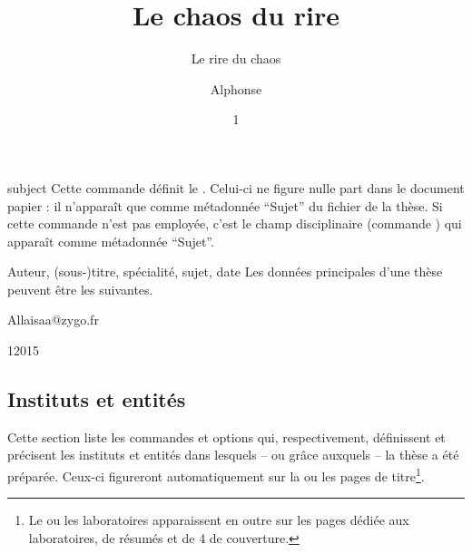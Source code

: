 %
\begin{docCommand}{subject}{}
  Cette commande définit le .  Celui-ci ne figure nulle
  part dans le document papier : il n'apparaît que comme métadonnée
  \enquote{Sujet} du fichier \pdf de la thèse. Si cette commande n'est pas
  employée, c'est le champ disciplinaire (commande ) qui
  apparaît comme métadonnée \enquote{Sujet}.
\end{docCommand}

\begin{dbexample}{Auteur, (sous-)titre, spécialité, sujet, date}{}
  Les données principales d'une thèse peuvent être les suivantes.
  \NoAutoSpacing%
\begin{bodycode}[listing options={deletekeywords={[2]title}}]
\author{Alphonse}{Allais}{aa@zygo.fr}
\title[Laugh's Chaos]{Le chaos du rire}
\subtitle[Chaos' laugh]{Le rire du chaos}
\date{1}{1}{2015}
\subject{Rire chaotique}
\end{bodycode}
\end{dbexample}

\subsection{Instituts et entités}\label{sec:entites}

Cette section liste les commandes et options qui, respectivement, définissent
et précisent les instituts et entités dans lesquels -- ou grâce auxquels -- la
thèse a été préparée. Ceux-ci figureront automatiquement sur la ou les pages de
titre\footnote{Le ou les laboratoires apparaissent en outre sur les pages
  dédiée aux laboratoires, de résumés et de 4\ieme{} de couverture.}.

